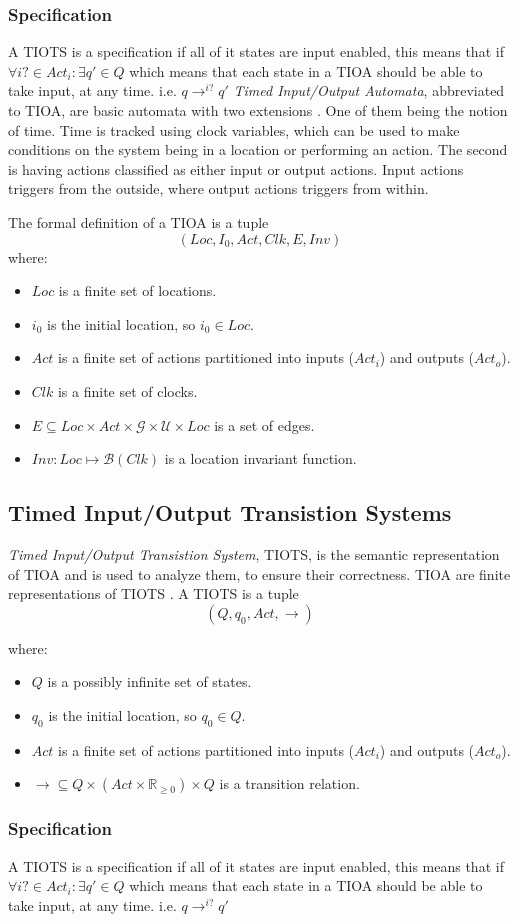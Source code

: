 \subsubsection{Specification}
A TIOTS is a specification if all of it states are input enabled, this means that if $\forall i? \in Act_i : \exists q' \in Q$ which means that each state in a TIOA should be able to take input, at any time. i.e. $q \rightarrow^{i?} q'$\cite{}
\emph{Timed Input/Output Automata}, abbreviated to TIOA, are basic automata with two extensions \cite{ecdartheory}. One of them being the notion of time. Time is tracked using clock variables, which can be used to make conditions on the system being in a location or performing an action. The second is having actions classified as either input or output actions. Input actions triggers from the outside, where output actions triggers from within. 

The formal definition of a TIOA is a tuple \cite{ecdartheory} $$(Loc, I_{0}, Act, Clk, E, Inv)$$  
where:

\begin{itemize}
    \item $Loc$ is a finite set of locations.
    \item $i_{0}$ is the initial location, so $i_{0} \in Loc$.
    \item $Act$ is a finite set of actions partitioned into inputs ($Act_{i}$) and outputs ($Act_{o}$).
    \item $Clk$ is a finite set of clocks.
    \item $E \subseteq Loc \times Act \times \mathcal{G} \times \mathcal{U} \times Loc$ is a set of edges.
    \item $Inv : Loc \mapsto \mathcal{B}(Clk)$ is a location invariant function. 
\end{itemize}

\subsection{Timed Input/Output Transistion Systems}\label{sec:TIOTS}

\emph{Timed Input/Output Transistion System}, TIOTS, is the semantic representation of TIOA and is used to analyze them, to ensure their correctness. TIOA are finite representations of TIOTS \cite{}. A TIOTS is a tuple \cite{}  $$(Q, q_{0}, Act, \rightarrow)$$

where:

\begin{itemize}
    \item $Q$ is a possibly infinite set of states.
    \item $q_{0}$ is the initial location, so $q_{0} \in Q$.
    \item $Act$ is a finite set of actions partitioned into inputs ($Act_{i}$) and outputs ($Act_{o}$).
    \item $\rightarrow \subseteq Q \times (Act \times \mathbb{R}_{\geq 0}) \times Q$ is a transition relation.
\end{itemize}

\subsubsection{Specification}
A TIOTS is a specification if all of it states are input enabled, this means that if $\forall i? \in Act_i : \exists q' \in Q$ which means that each state in a TIOA should be able to take input, at any time. i.e. $q \rightarrow^{i?} q'$\cite{}
